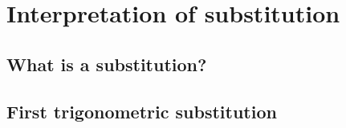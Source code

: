 \chapter{Interpretation of substitution}

\section{What is a substitution?}

\section{First trigonometric substitution}
